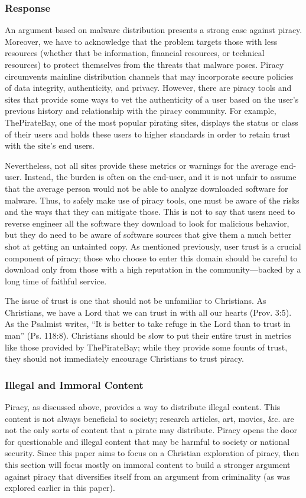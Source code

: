 \documentclass[onecolumn, 12pt]{article}
\begin{document}
\begin{refsection}
\subsubsection{Response}
An argument based on malware distribution presents a strong case against piracy.
Moreover, we have to acknowledge that the problem targets those with less
resources (whether that be information, financial resources, or technical
resources) to protect themselves from the threats that malware poses. Piracy
circumvents mainline distribution channels that may incorporate secure policies
of data integrity, authenticity, and privacy. However, there are piracy tools
and sites that provide some ways to vet the authenticity of a user based on the
user's previous history and relationship with the piracy community. For example,
ThePirateBay, one of the most popular pirating sites, displays the status or
class of their users and holds these users to higher standards in order to
retain trust with the site's end users.~\cite{suprbay:status}

Nevertheless, not all sites provide these metrics or warnings for the average
end-user. Instead, the burden is often on the end-user, and it is not unfair to
assume that the average person would not be able to analyze downloaded software
for malware. Thus, to safely make use of piracy tools, one must be aware of the
risks and the ways that they can mitigate those. This is not to say that users
need to reverse engineer all the software they download to look for malicious
behavior, but they do need to be aware of software sources that give them a
much better shot at getting an untainted copy. As mentioned previously, user
trust is a crucial component of piracy; those who choose to enter this domain
should be careful to download only from those with a high reputation in the
community---backed by a long time of faithful service.

The issue of trust is one that should not be unfamiliar to Christians. As
Christians, we have a Lord that we can trust in with all our hearts (Prov. 3:5).
As the Psalmist writes, \enquote{It is better to take refuge in the Lord than
to trust in man} (Ps. 118:8). Christians should be slow to put their entire
trust in metrics like those provided by ThePirateBay; while they provide some
founts of trust, they should not immediately encourage Christians to trust
piracy.

\subsubsection{Illegal and Immoral Content}
Piracy, as discussed above, provides a way to distribute illegal content. This
content is not always beneficial to society; research articles, art, movies, \&c.
are not the only sorts of content that a pirate may distribute. Piracy opens
the door for questionable and illegal content that may be harmful to society
or national security. Since this paper aims to focus on a Christian exploration
of piracy, then this section will focus mostly on immoral content to build a
stronger argument against piracy that diversifies itself from an argument from
criminality (as was explored earlier in this paper).


\end{refsection}
\end{document}
